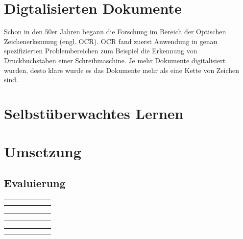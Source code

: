 \chapter{Digtalisierten Dokumente}



% 
Schon in den 50er Jahren begann die Forschung im Bereich der Optischen Zeichenerkennung (engl. OCR)\autocite{BairdEvolutionDocumentImage2014}. OCR fand zuerst Anwendung in genau spezifizierten Problembereichen zum Beispiel die Erkennung von Druckbuchstaben einer Schreibmaschine. 
Je mehr Dokumente digitalisiert wurden, desto klare wurde es das Dokumente mehr als 
eine Kette von Zeichen sind. 

\chapter{Selbstüberwachtes Lernen}


\chapter{Umsetzung}

\section{Evaluierung}


\newcommand{\resulttable}[2]{
    \begin{tabular}{l|r|r|r|r|r}%
        \hline
        \csvreader[head to column names, filter equal={\dataset}{#1}]{results/document_image_segmentation_results.csv}{}%
        {#2}
        \\\hline
        \end
        {tabular}
}

\resulttable{CB55}{\\ \name & \pixelacc & \FgPA & \meanacc & \meanIU & \fwIU}
\resulttable{CSG18}{\\  \pixelacc & \FgPA & \meanacc & \meanIU & \fwIU}
\resulttable{CSG863}{\\  \pixelacc & \FgPA & \meanacc & \meanIU & \fwIU}
